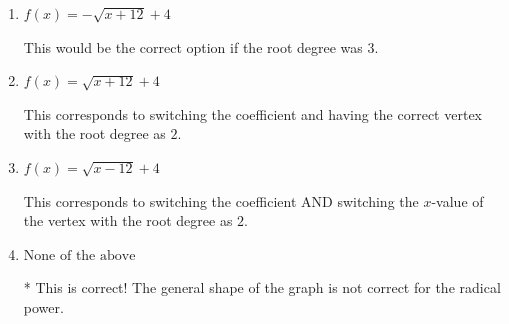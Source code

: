\documentclass{extbook}[14pt]
\begin{document}
\begin{enumerate}
{\begin{enumerate}[label=\Alph*.]
This corresponds to the correct coefficient and switching the $x$-value of the vertex with the root degree as $2$.
\item \( f(x) = - \sqrt{x + 12} + 4 \)

This would be the correct option if the root degree was $3$.
\item \( f(x) = \sqrt{x + 12} + 4 \)

This corresponds to switching the coefficient and having the correct vertex with the root degree as $2$.
\item \( f(x) = \sqrt{x - 12} + 4 \)

This corresponds to switching the coefficient AND switching the $x$-value of the vertex with the root degree as $2$.
\item \( \text{None of the above} \)

* This is correct! The general shape of the graph is not correct for the radical power.
\end{enumerate}

}
\end{enumerate}
\end{document}
